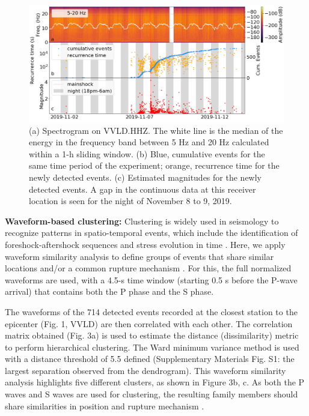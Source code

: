 \documentclass[a4paper,12pt,twoside]{article}
\begin{document}
\begin{figure}
    \centering
     \includegraphics[width=1\linewidth]{spec_rec_mag.png}    \caption{(a) Spectrogram on VVLD.HHZ. The white line is the median of the energy in the frequency band between 5 Hz and 20 Hz calculated within a 1-h sliding window. (b) Blue, cumulative events for the same time period of the experiment; orange, recurrence time for the newly detected events. (c) Estimated magnitudes for the newly detected events. A gap in the continuous data at this receiver location is seen for the night of November 8 to 9, 2019.}
\end{figure}    \label{fig:spectrum}


{\bf Waveform-based clustering:} Clustering is widely used in seismology to recognize patterns in spatio-temporal events, which include the identification of foreshock-aftershock sequences and stress evolution in time \citep[\emph{e.g.},][]{Kagan_1991_LTE, wehling_2013_IDT, Cesca_2014_SMC, Ellsworth_2018_NIE}. Here, we apply waveform similarity analysis \citep{Cattaneo_1999_WSA} to define groups of events that share similar locations and/or a common rupture mechanism \citep{Kagan_1991_LTE, wehling_2013_IDT, Cesca_2014_SMC, Ellsworth_2018_NIE, Cattaneo_1999_WSA}. For this, the full normalized waveforms are used, with a 4.5-s time window (starting 0.5 s before the P-wave arrival) that contains both the P phase and the S phase. 

The waveforms of the 714 detected events recorded at the closest station to the epicenter (Fig. 1, VVLD) are then correlated with each other. The correlation matrix obtained (Fig. 3a) is used to estimate the distance (dissimilarity) metric to perform hierarchical clustering. The Ward minimum variance method is used \citep{Ward_1963_HGO} with  a distance threshold of 5.5 defined (Supplementary Materials Fig. S1: the largest separation observed from the dendrogram). This waveform similarity analysis highlights five different clusters, as shown in Figure 3b, c. As both the P waves and S waves are used for clustering, the resulting family members should share similarities in position and rupture mechanism \citep{Kagan_1991_LTE, wehling_2013_IDT, Cesca_2014_SMC, Ellsworth_2018_NIE, Cattaneo_1999_WSA}.
\end{document}
